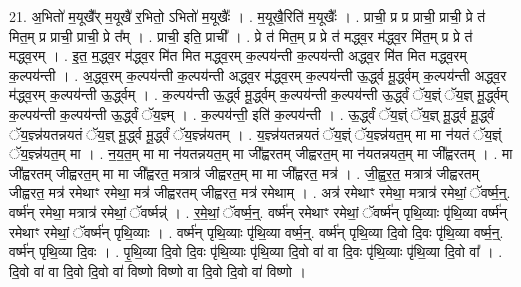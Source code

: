 \documentclass[17pt]{extarticle}
\begin{document}
21. अ॒भितो॑ म॒यूखै᳚र् म॒यूखै॑ र॒भितो॒ ऽभितो॑ म॒यूखैः᳚ । . म॒यूखै॒रिति॑ म॒यूखैः᳚ । . प्राची॒ प्र प्र प्राची॒ प्राची॒ प्रे त॑ मित॒म् प्र प्राची॒ प्राची॒ प्रे त᳚म् । . प्राची॒ इति॒ प्राची᳚ । . प्रे त॑ मित॒म् प्र प्रे त॑ मद्ध्व॒र म॑द्ध्व॒र मि॑त॒म् प्र प्रे त॑ मद्ध्व॒रम् । . इ॒त॒ म॒द्ध्व॒र म॑द्ध्व॒र मि॑त मित मद्ध्व॒रम् क॒ल्पय॑न्ती क॒ल्पय॑न्ती अद्ध्व॒र मि॑त मित मद्ध्व॒रम् क॒ल्पय॑न्ती । . अ॒द्ध्व॒रम् क॒ल्पय॑न्ती क॒ल्पय॑न्ती अद्ध्व॒र म॑द्ध्व॒रम् क॒ल्पय॑न्ती ऊ॒र्द्ध्व मू॒र्द्ध्वम् क॒ल्पय॑न्ती अद्ध्व॒र म॑द्ध्व॒रम् क॒ल्पय॑न्ती ऊ॒र्द्ध्वम् । . क॒ल्पय॑न्ती ऊ॒र्द्ध्व मू॒र्द्ध्वम् क॒ल्पय॑न्ती क॒ल्पय॑न्ती ऊ॒र्द्ध्वं ॅय॒ज्ञ्ं ॅय॒ज्ञ् मू॒र्द्ध्वम् क॒ल्पय॑न्ती क॒ल्पय॑न्ती ऊ॒र्द्ध्वं ॅय॒ज्ञ्म् । . क॒ल्पय॑न्ती॒ इति॑ क॒ल्पय॑न्ती । . ऊ॒र्द्ध्वं ॅय॒ज्ञ्ं ॅय॒ज्ञ् मू॒र्द्ध्व मू॒र्द्ध्वं ॅय॒ज्ञ्न्न॑यतन्नयतं ॅय॒ज्ञ् मू॒र्द्ध्व मू॒र्द्ध्वं ॅय॒ज्ञ्न्न॑यतम् । . य॒ज्ञ्न्न॑यतन्नयतं ॅय॒ज्ञ्ं ॅय॒ज्ञ्न्न॑यत॒म् मा मा न॑यतं ॅय॒ज्ञ्ं ॅय॒ज्ञ्न्न॑यत॒म् मा । . न॒य॒त॒म् मा मा न॑यतन्नयत॒म् मा जी᳚ह्वरतम् जीह्वरत॒म् मा न॑यतन्नयत॒म् मा जी᳚ह्वरतम् । . मा जी᳚ह्वरतम् जीह्वरत॒म् मा मा जी᳚ह्वरत॒ मत्रात्र॑ जीह्वरत॒म् मा मा जी᳚ह्वरत॒ मत्र॑ । . जी॒ह्व॒र॒त॒ मत्रात्र॑ जीह्वरतम् जीह्वरत॒ मत्र॑ रमेथाꣳ रमेथा॒ मत्र॑ जीह्वरतम् जीह्वरत॒ मत्र॑ रमेथाम् । . अत्र॑ रमेथाꣳ रमेथा॒ मत्रात्र॑ रमेथां॒ ॅवर्ष्म॒न्॒. वर्ष्म॑न् रमेथा॒ मत्रात्र॑ रमेथां॒ ॅवर्ष्मन्न्॑ । . र॒मे॒थां॒ ॅवर्ष्म॒न्॒. वर्ष्म॑न् रमेथाꣳ रमेथां॒ ॅवर्ष्म॑न् पृथि॒व्याः पृ॑थि॒व्या वर्ष्म॑न् रमेथाꣳ रमेथां॒ ॅवर्ष्म॑न् पृथि॒व्याः । . वर्ष्म॑न् पृथि॒व्याः पृ॑थि॒व्या वर्ष्म॒न्॒. वर्ष्म॑न् पृथि॒व्या दि॒वो दि॒वः पृ॑थि॒व्या वर्ष्म॒न्॒. वर्ष्म॑न् पृथि॒व्या दि॒वः । . पृ॒थि॒व्या दि॒वो दि॒वः पृ॑थि॒व्याः पृ॑थि॒व्या दि॒वो वा॑ वा दि॒वः पृ॑थि॒व्याः पृ॑थि॒व्या दि॒वो वा᳚ । . दि॒वो वा॑ वा दि॒वो दि॒वो वा॑ विष्णो विष्णो वा दि॒वो दि॒वो वा॑ विष्णो । \newline
\end{document}
